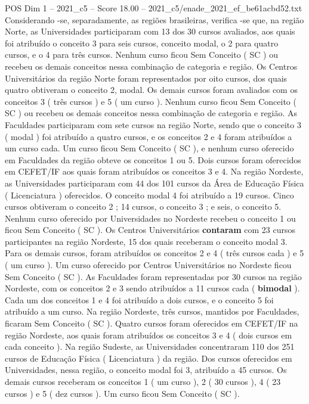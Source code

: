 \begin{textsample}{POS Dim 1 – 2021\_c5 – Score 18.00 – 2021\_c5/enade\_2021\_ef\_be61acbd52.txt}
Considerando -se, separadamente, as regiões brasileiras, verifica -se que, na região Norte, as Universidades participaram com 13 dos 30 cursos avaliados, aos quais foi atribuído o conceito 3 para seis cursos, conceito modal, o 2 para quatro cursos, e o 4 para três cursos.
Nenhum curso ficou Sem Conceito ( SC ) ou recebeu os demais conceitos nessa combinação de categoria e região.
Os Centros Universitários da região Norte foram representados por oito cursos, dos quais quatro obtiveram o conceito 2, modal.
Os demais cursos foram avaliados com os conceitos 3 ( três cursos ) e 5 ( um curso ).
Nenhum curso ficou Sem Conceito ( SC ) ou recebeu os demais conceitos nessa combinação de categoria e região.
As Faculdades participaram com sete cursos na região Norte, sendo que o conceito 3 ( modal ) foi atribuído a quatro cursos, e os conceitos 2 e 4 foram atribuídos a um curso cada.
Um curso ficou Sem Conceito ( SC ), e nenhum curso oferecido em Faculdades da região obteve os conceitos 1 ou 5.
Dois cursos foram oferecidos em CEFET/IF aos quais foram atribuídos os conceitos 3 e 4.
Na região Nordeste, as Universidades participaram com 44 dos 101 cursos da Área de Educação Física ( Licenciatura ) oferecidos.
O conceito modal 4 foi atribuído a 19 cursos.
Cinco cursos obtiveram o conceito 2 ; 14 cursos, o conceito 3 ; e seis, o conceito 5.
Nenhum curso oferecido por Universidades no Nordeste recebeu o conceito 1 ou ficou Sem Conceito ( SC ).
Os Centros Universitários \textbf{contaram} com 23 cursos participantes na região Nordeste, 15 dos quais receberam o conceito modal 3.
Para os demais cursos, foram atribuídos os conceitos 2 e 4 ( três cursos cada ) e 5 ( um curso ).
Um curso oferecido por Centros Universitários no Nordeste ficou Sem Conceito ( SC ).
As Faculdades foram representadas por 30 cursos na região Nordeste, com os conceitos 2 e 3 sendo atribuídos a 11 cursos cada ( \textbf{bimodal} ).
Cada um dos conceitos 1 e 4 foi atribuído a dois cursos, e o conceito 5 foi atribuído a um curso.
Na região Nordeste, três cursos, mantidos por Faculdades, ficaram Sem Conceito ( SC ).
Quatro cursos foram oferecidos em CEFET/IF na região Nordeste, aos quais foram atribuídos os conceitos 3 e 4 ( dois cursos em cada conceito ).
Na região Sudeste, as Universidades concentraram 110 dos 251 cursos de Educação Física ( Licenciatura ) da região.
Dos cursos oferecidos em Universidades, nessa região, o conceito modal foi 3, atribuído a 45 cursos.
Os demais cursos receberam os conceitos 1 ( um curso ), 2 ( 30 cursos ), 4 ( 23 cursos ) e 5 ( dez cursos ).
Um curso ficou Sem Conceito ( SC ).

\end{textsample}
